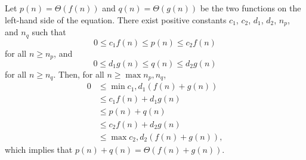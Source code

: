 Let $p(n)=\Theta(f(n))$ and $q(n)=\Theta(g(n))$ be the two functions on the left-hand side of the equation.
There exist positive constants $c_1$, $c_2$, $d_1$, $d_2$, $n_p$, and $n_q$ such that
\[
    0 \le c_1f(n) \le p(n) \le c_2f(n)
\]
for all $n\ge n_p$, and
\[
    0 \le d_1g(n) \le q(n) \le d_2g(n)
\]
for all $n\ge n_q$.
Then, for all $n\ge\max{n_p,n_q}$,
\begin{align*}
    0 &\le \min{c_1,d_1}(f(n)+g(n)) \\
    &\le c_1f(n)+d_1g(n) \\
    &\le p(n)+q(n) \\
    &\le c_2f(n)+d_2g(n) \\
    &\le \max{c_2,d_2}(f(n)+g(n)),
\end{align*}
which implies that $p(n)+q(n)=\Theta(f(n)+g(n))$.
